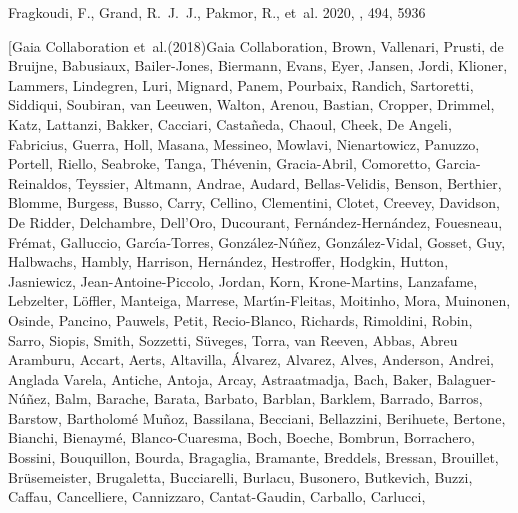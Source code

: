 \documentclass[onecolumn]{aa}
\begin{document}
\begin{thebibliography}{149}
	{Fragkoudi}, F., {Grand}, R.~J.~J., {Pakmor}, R., {et~al.} 2020, \mnras, 494,
	5936
	
	\bibitem[{{Gaia Collaboration} {et~al.}(2018){Gaia Collaboration}, {Brown},
		{Vallenari}, {Prusti}, {de Bruijne}, {Babusiaux}, {Bailer-Jones}, {Biermann},
		{Evans}, {Eyer}, {Jansen}, {Jordi}, {Klioner}, {Lammers}, {Lindegren},
		{Luri}, {Mignard}, {Panem}, {Pourbaix}, {Randich}, {Sartoretti}, {Siddiqui},
		{Soubiran}, {van Leeuwen}, {Walton}, {Arenou}, {Bastian}, {Cropper},
		{Drimmel}, {Katz}, {Lattanzi}, {Bakker}, {Cacciari}, {Casta{\~n}eda},
		{Chaoul}, {Cheek}, {De Angeli}, {Fabricius}, {Guerra}, {Holl}, {Masana},
		{Messineo}, {Mowlavi}, {Nienartowicz}, {Panuzzo}, {Portell}, {Riello},
		{Seabroke}, {Tanga}, {Th{\'e}venin}, {Gracia-Abril}, {Comoretto},
		{Garcia-Reinaldos}, {Teyssier}, {Altmann}, {Andrae}, {Audard},
		{Bellas-Velidis}, {Benson}, {Berthier}, {Blomme}, {Burgess}, {Busso},
		{Carry}, {Cellino}, {Clementini}, {Clotet}, {Creevey}, {Davidson}, {De
			Ridder}, {Delchambre}, {Dell'Oro}, {Ducourant},
		{Fern{\'a}ndez-Hern{\'a}ndez}, {Fouesneau}, {Fr{\'e}mat}, {Galluccio},
		{Garc{\'\i}a-Torres}, {Gonz{\'a}lez-N{\'u}{\~n}ez}, {Gonz{\'a}lez-Vidal},
		{Gosset}, {Guy}, {Halbwachs}, {Hambly}, {Harrison}, {Hern{\'a}ndez},
		{Hestroffer}, {Hodgkin}, {Hutton}, {Jasniewicz}, {Jean-Antoine-Piccolo},
		{Jordan}, {Korn}, {Krone-Martins}, {Lanzafame}, {Lebzelter}, {L{\"o}ffler},
		{Manteiga}, {Marrese}, {Mart{\'\i}n-Fleitas}, {Moitinho}, {Mora}, {Muinonen},
		{Osinde}, {Pancino}, {Pauwels}, {Petit}, {Recio-Blanco}, {Richards},
		{Rimoldini}, {Robin}, {Sarro}, {Siopis}, {Smith}, {Sozzetti}, {S{\"u}veges},
		{Torra}, {van Reeven}, {Abbas}, {Abreu Aramburu}, {Accart}, {Aerts},
		{Altavilla}, {{\'A}lvarez}, {Alvarez}, {Alves}, {Anderson}, {Andrei},
		{Anglada Varela}, {Antiche}, {Antoja}, {Arcay}, {Astraatmadja}, {Bach},
		{Baker}, {Balaguer-N{\'u}{\~n}ez}, {Balm}, {Barache}, {Barata}, {Barbato},
		{Barblan}, {Barklem}, {Barrado}, {Barros}, {Barstow}, {Bartholom{\'e}
			Mu{\~n}oz}, {Bassilana}, {Becciani}, {Bellazzini}, {Berihuete}, {Bertone},
		{Bianchi}, {Bienaym{\'e}}, {Blanco-Cuaresma}, {Boch}, {Boeche}, {Bombrun},
		{Borrachero}, {Bossini}, {Bouquillon}, {Bourda}, {Bragaglia}, {Bramante},
		{Breddels}, {Bressan}, {Brouillet}, {Br{\"u}semeister}, {Brugaletta},
		{Bucciarelli}, {Burlacu}, {Busonero}, {Butkevich}, {Buzzi}, {Caffau},
		{Cancelliere}, {Cannizzaro}, {Cantat-Gaudin}, {Carballo}, {Carlucci},
}
\end{thebibliography}
\end{document}

